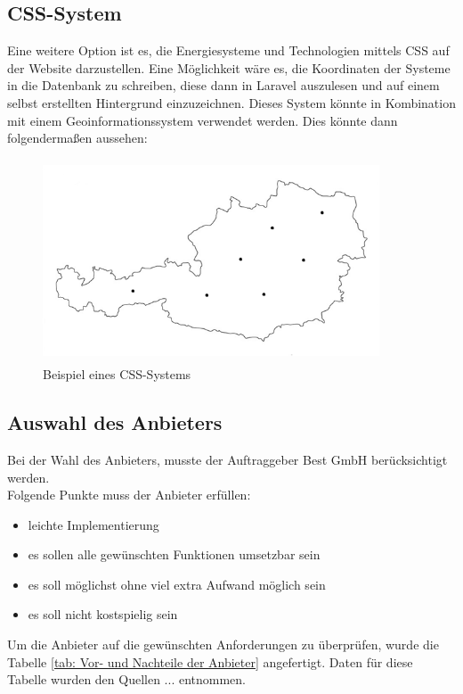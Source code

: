 \subsection{CSS-System}
Eine weitere Option ist es, die Energiesysteme und Technologien mittels CSS auf der Website darzustellen. Eine Möglichkeit wäre es, die Koordinaten der Systeme in die Datenbank zu schreiben, diese dann in Laravel auszulesen und auf einem selbst erstellten Hintergrund  einzuzeichnen. Dieses System könnte in Kombination mit einem Geoinformationssystem verwendet werden. Dies könnte dann folgendermaßen aussehen: 

\begin{figure}[h]
	\centering
	\includegraphics[height=6cm,width=10cm]{images/CSS_System}
	\caption{Beispiel eines CSS-Systems}
	\label{fig:CSS_System}
\end{figure}

\newpage
\subsection{Auswahl des Anbieters}
	Bei der Wahl des Anbieters, musste der Auftraggeber Best GmbH berücksichtigt werden. \\Folgende Punkte muss der Anbieter erfüllen:
	\begin{itemize}
		\item leichte Implementierung 
		\item es sollen alle gewünschten Funktionen umsetzbar sein 
		\item es soll möglichst ohne viel extra Aufwand möglich sein  
		\item es soll nicht kostspielig sein 
	\end{itemize}

Um die Anbieter auf die gewünschten Anforderungen zu überprüfen, wurde die Tabelle \ref{tab: Vor- und Nachteile der Anbieter} angefertigt. Daten für diese Tabelle wurden den Quellen ... entnommen.

